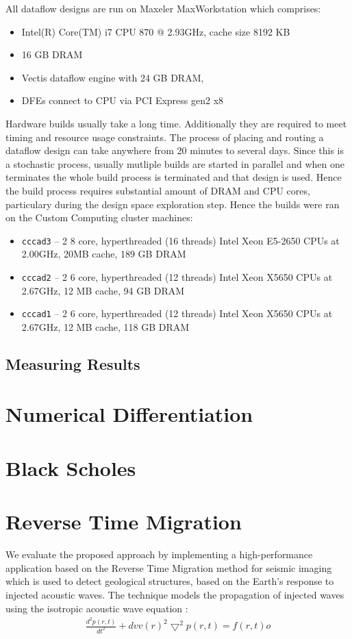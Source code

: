 All dataflow designs are run on Maxeler MaxWorkstation
\cite{MaxWorkstation} which comprises:
\begin{itemize}
\item Intel(R) Core(TM) i7 CPU 870 @ 2.93GHz, cache size 8192 KB
\item 16 GB DRAM
\item Vectis dataflow engine with 24 GB DRAM,
\item DFEs connect to CPU via PCI Express gen2 x8
\end{itemize}

Hardware builds usually take a long time. Additionally they are
required to meet timing and resource usage constraints. The process of
placing and routing a dataflow design can take anywhere from 20
minutes to several days. Since this is a stochastic process, usually
mutliple builds are started in parallel and when one terminates the
whole build process is terminated and that design is used. Hence the
build process requires substantial amount of DRAM and CPU cores,
particulary during the design space exploration step. Hence the builds
were ran on the Custom Computing cluster machines:

\begin{itemize}
\item \texttt{cccad3} -- 2 8 core, hyperthreaded (16 threads) Intel
  Xeon E5-2650 CPUs at 2.00GHz, 20MB cache, 189 GB DRAM
\item \texttt{cccad2} -- 2 6 core, hyperthreaded (12 threads) Intel
  Xeon X5650 CPUs at 2.67GHz, 12 MB cache, 94 GB DRAM
\item \texttt{cccad1} -- 2 6 core, hyperthreaded (12 threads) Intel Xeon
  X5650 CPUs at 2.67GHz, 12 MB cache, 118 GB DRAM
\end{itemize}

\subsection{Measuring Results}

\section{Numerical Differentiation}

\section{Black Scholes}

\section{Reverse Time Migration}
\label{sec:RTM}
We evaluate the proposed approach by implementing a high-performance
application based on the Reverse Time Migration method for seismic
imaging which is used to detect geological structures, based on the
Earth's response to injected acoustic waves. The technique models the
propagation of injected waves using the isotropic acoustic wave
equation \cite{araya2011assessing}:
\begin{align}
\frac{d^2p(r,t)}{dt^2} + {dvv(r)}^2\bigtriangledown^2p(r,t) = f(r,t)
o\end{align}

